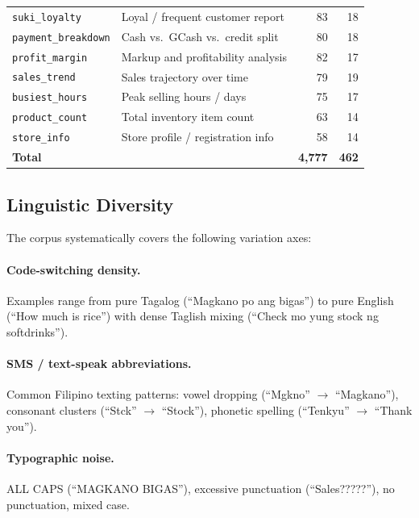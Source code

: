 \documentclass[11pt,a4paper]{article}
\begin{document}
\begin{table}[h]
\begin{tabular}{llrr}
\texttt{suki\_loyalty}      & Loyal / frequent customer report    & 83   & 18 \\
\texttt{payment\_breakdown} & Cash vs.\ GCash vs.\ credit split  & 80   & 18 \\
\texttt{profit\_margin}     & Markup and profitability analysis   & 82   & 17 \\
\texttt{sales\_trend}       & Sales trajectory over time          & 79   & 19 \\
\texttt{busiest\_hours}     & Peak selling hours / days           & 75   & 17 \\
\texttt{product\_count}     & Total inventory item count          & 63   & 14 \\
\texttt{store\_info}        & Store profile / registration info   & 58   & 14 \\
\midrule
\textbf{Total}              &                                     & \textbf{4{,}777} & \textbf{462} \\
\bottomrule
\end{tabular}
\end{table}

\subsection{Linguistic Diversity}
\label{sec:diversity}

The corpus systematically covers the following variation axes:

\paragraph{Code-switching density.}
Examples range from pure Tagalog (``Magkano po ang bigas'') to pure English
(``How much is rice'') with dense Taglish mixing (``Check mo yung stock ng
softdrinks'').

\paragraph{SMS / text-speak abbreviations.}
Common Filipino texting patterns: vowel dropping (``Mgkno'' $\to$ ``Magkano''),
consonant clusters (``Stck'' $\to$ ``Stock''), phonetic spelling
(``Tenkyu'' $\to$ ``Thank you'').

\paragraph{Typographic noise.}
ALL CAPS (``MAGKANO BIGAS''), excessive punctuation (``Sales?????''),
no punctuation, mixed case.
\end{document}
